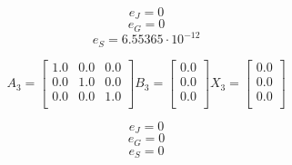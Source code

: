 \documentclass{article}
\begin{document}
\[ e_J = 0 \]
\[ e_G = 0 \]
\[ e_S = 6.55365 \cdot 10^{-12} \]

\[
A_3 =
\begin{bmatrix}
    1.0 & 0.0 & 0.0 \\
    0.0 & 1.0 & 0.0 \\
    0.0 & 0.0 & 1.0 \\
\end{bmatrix}
B_3 = 
\begin{bmatrix}
    0.0 \\
    0.0 \\
    0.0 \\
\end{bmatrix}
X_3 = 
\begin{bmatrix}
    0.0 \\
    0.0 \\
    0.0 \\
\end{bmatrix}
\]
\noindent
{}

\[ e_J = 0 \]
\[ e_G = 0 \]
\[ e_S = 0 \]
\end{document}
